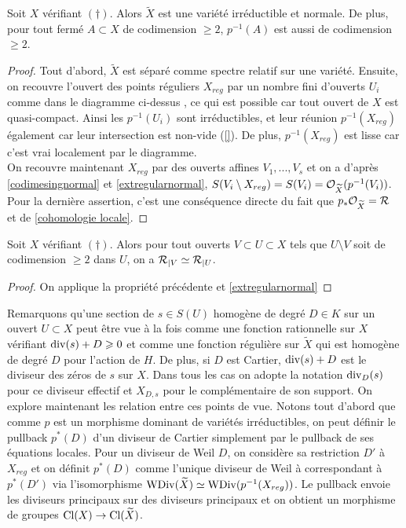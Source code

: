 \begin{prop}\label{preimagecodim2}
Soit $X$ vérifiant $(\dagger)$. Alors $\widetilde{X}$ est une variété irréductible et normale. De plus, pour tout fermé $A\subset X$ de codimension $\geq 2$, $p^{-1}(A)$ est aussi de codimension $\geq 2$.
\end{prop}
\begin{proof}
Tout d'abord, $\widetilde{X}$ est séparé comme spectre relatif sur une variété. Ensuite, on recouvre l'ouvert des points réguliers $X_{reg}$ par un nombre fini d'ouverts $U_i$ comme dans le diagramme ci-dessus , ce qui est possible car tout ouvert de $X$ est quasi-compact. Ainsi les $p^{-1}(U_i)$ sont irréductibles, et leur réunion $p^{-1}(X_{reg})$ également car leur intersection est non-vide (\ref{}). De plus, $p^{-1}(X_{reg})$ est lisse car c'est vrai localement par le diagramme.\\
On recouvre maintenant $X_{reg}$ par des ouverts affines $V_1,...,V_s$ et on a d'après \ref{codimesingnormal} et \ref{extregularnormal}, $S(V_i\setminus X_{reg})=S(V_i)=\mathcal{O}_{\widetilde{X}}(p^{-1}(V_i))$.\\
Pour la dernière assertion, c'est une conséquence directe du fait que $p_*\mathcal{O}_{\widetilde{X}}=\mathcal{R}$ et de \ref{cohomologie locale}.
\end{proof}

\begin{cor}
Soit $X$ vérifiant $(\dagger)$. Alors pour tout ouverts $V\subset U\subset X$ tels que $U\setminus V$ soit de codimension $\geq 2$ dans $U$, on a $\mathcal{R}_{|V}\simeq \mathcal{R}_{|U}$.
\end{cor}
\begin{proof}
On applique la propriété précédente et \ref{extregularnormal}
\end{proof}

Remarquons qu'une section de $s\in S(U)$ homogène de degré $D\in K$ sur un ouvert $U\subset X$ peut être vue à la fois comme une fonction rationnelle sur $X$ vérifiant $\operatorname{div}(s)+D\geqslant 0$ et comme une fonction régulière sur $\widetilde{X}$ qui est homogène de degré $D$ pour l'action de $H$. De plus, si $D$ est Cartier, $\operatorname{div}(s)+D$ est le diviseur des zéros de $s$ sur $X$. Dans tous les cas on adopte la notation $\operatorname{div}_D(s)$ pour ce diviseur effectif et $X_{D,s}$ pour le complémentaire de son support. On explore maintenant les relation entre ces points de vue. Notons tout d'abord que comme $p$ est un morphisme dominant de variétés irréductibles, on peut définir le pullback $p^*(D)$ d'un diviseur de Cartier simplement par le pullback de ses équations locales. Pour un diviseur de Weil $D$, on considère sa restriction $D'$ à $X_{reg}$ et on définit $p^*(D)$ comme l'unique diviseur de Weil à correspondant à $p^*(D')$ via l'isomorphisme $\operatorname{WDiv}(\widetilde{X})\simeq\operatorname{WDiv}(p^{-1}(X_{reg}))$. Le pullback envoie les diviseurs principaux sur des diviseurs principaux et on obtient un morphisme de groupes $\operatorname{Cl}(X)\rightarrow \operatorname{Cl}(\widetilde{X})$.

